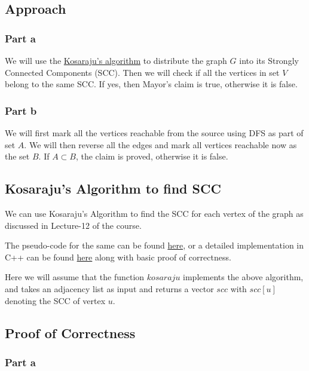 \documentclass{article}
\begin{document}
\subsection{Approach}

\subsubsection{Part a}

We will use the \underline{Kosaraju's algorithm} to distribute the graph $G$ into its Strongly Connected Components (SCC). Then we will check if all the vertices in set $V$ belong to the same SCC. If yes, then Mayor's claim is true, otherwise it is false.

\subsubsection{Part b}

We will first mark all the vertices reachable from the source using DFS as part of set $A$. We will then reverse all the edges and mark all vertices reachable now as the set $B$. If $A \subset B$, the claim is proved, otherwise it is false.

\subsection{Kosaraju's Algorithm to find SCC}

We can use Kosaraju's Algorithm to find the SCC for each vertex of the graph as discussed in Lecture-12 of the course.

The pseudo-code for the same can be found \href{https://en.wikipedia.org/wiki/Kosaraju%27s_algorithm#The_algorithm}{here}, or a detailed implementation in C++ can be found \href{https://cp-algorithms.com/graph/strongly-connected-components.html}{here} along with basic proof of correctness.

Here we will assume that the function $kosaraju$ implements the above algorithm, and takes an adjacency list as input and returns a vector $scc$ with $scc[u]$ denoting the SCC of vertex $u$.

\subsection{Proof of Correctness}

\subsubsection{Part a}
\end{document}
